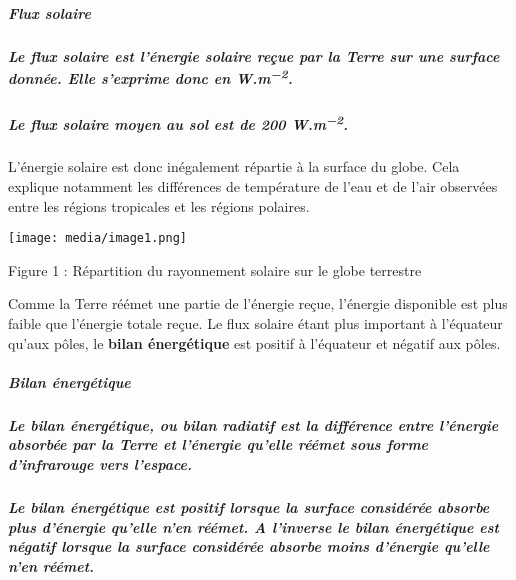 \subparagraph{Flux solaire}\label{flux-solaire}

\subparagraph{\texorpdfstring{Le flux solaire est l'énergie solaire
reçue par la Terre sur une surface donnée. Elle s'exprime donc en
W.m\textsuperscript{−2}.}{Le flux solaire est l'énergie solaire reçue par la Terre sur une surface donnée. Elle s'exprime donc en W.m−2.}}\label{le-flux-solaire-est-luxe9nergie-solaire-reuxe7ue-par-la-terre-sur-une-surface-donnuxe9e.-elle-sexprime-donc-en-w.m2.}

\subparagraph{\texorpdfstring{Le flux solaire moyen au sol est de 200
W.m\textsuperscript{−2}.}{Le flux solaire moyen au sol est de 200 W.m−2.}}\label{le-flux-solaire-moyen-au-sol-est-de-200-w.m2.}

L'énergie solaire est donc inégalement répartie à la surface du globe.
Cela explique notamment les différences de température de l'eau et de
l'air observées entre les régions tropicales et les régions polaires.

\texttt{[image: media/image1.png]}

\protect\hypertarget{ruxe9partition-du-rayonnement-solaire-sur-l}{}{}Figure
1 : Répartition du rayonnement solaire sur le globe terrestre

Comme la Terre réémet une partie de l'énergie reçue, l'énergie
disponible est plus faible que l'énergie totale reçue. Le flux solaire
étant plus important à l'équateur qu'aux pôles, le \textbf{bilan
énergétique} est positif à l'équateur et négatif aux pôles.

\subparagraph{\texorpdfstring{\textbf{Bilan
énergétique}}{Bilan énergétique}}\label{bilan-uxe9nerguxe9tique}

\subparagraph{Le bilan énergétique, ou bilan radiatif est la différence
entre l'énergie absorbée par la Terre et l'énergie qu'elle réémet sous
forme d'infrarouge vers
l'espace.}\label{le-bilan-uxe9nerguxe9tique-ou-bilan-radiatif-est-la-diffuxe9rence-entre-luxe9nergie-absorbuxe9e-par-la-terre-et-luxe9nergie-quelle-ruxe9uxe9met-sous-forme-dinfrarouge-vers-lespace.}

\subparagraph{Le bilan énergétique est positif lorsque la surface
considérée absorbe plus d'énergie qu'elle n'en réémet. A l'inverse le
bilan énergétique est négatif lorsque la surface considérée absorbe
moins d'énergie qu'elle n'en
réémet.}\label{le-bilan-uxe9nerguxe9tique-est-positif-lorsque-la-surface-considuxe9ruxe9e-absorbe-plus-duxe9nergie-quelle-nen-ruxe9uxe9met.-a-linverse-le-bilan-uxe9nerguxe9tique-est-nuxe9gatif-lorsque-la-surface-considuxe9ruxe9e-absorbe-moins-duxe9nergie-quelle-nen-ruxe9uxe9met.}

